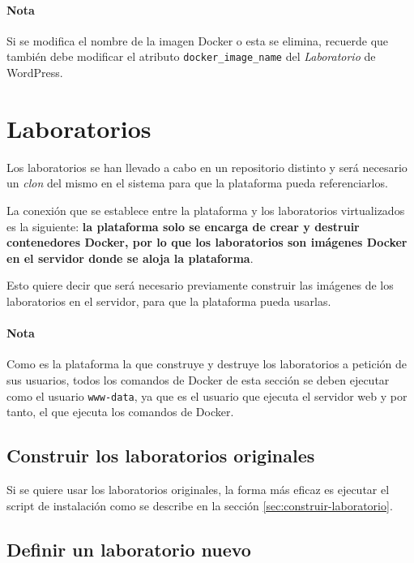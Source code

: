             \paragraph{Nota}

                Si se modifica el nombre de la imagen Docker o esta se elimina, recuerde que también debe modificar el atributo \texttt{docker\_image\_name} del \textit{Laboratorio} de WordPress.

            \newpage


    \section{Laboratorios}

        Los laboratorios se han llevado a cabo en un repositorio distinto y será necesario un \textit{clon} del mismo en el sistema para que la plataforma pueda referenciarlos.

        La conexión que se establece entre la plataforma y los laboratorios virtualizados es la siguiente: \textbf{la plataforma solo se encarga de crear y destruir contenedores Docker, por lo que los laboratorios son imágenes Docker en el servidor donde se aloja la plataforma}.

        Esto quiere decir que será necesario previamente construir las imágenes de los laboratorios en el servidor, para que la plataforma pueda usarlas.

        \paragraph{Nota}

            Como es la plataforma la que construye y destruye los laboratorios a petición de sus usuarios, todos los comandos de Docker de esta sección se deben ejecutar como el usuario \texttt{www-data}, ya que es el usuario que ejecuta el servidor web y por tanto, el que ejecuta los comandos de Docker.

        \subsection{Construir los laboratorios originales}

            Si se quiere usar los laboratorios originales, la forma más eficaz es ejecutar el script de instalación como se describe en la sección \ref{sec:construir-laboratorio}.

        \subsection{Definir un laboratorio nuevo}

